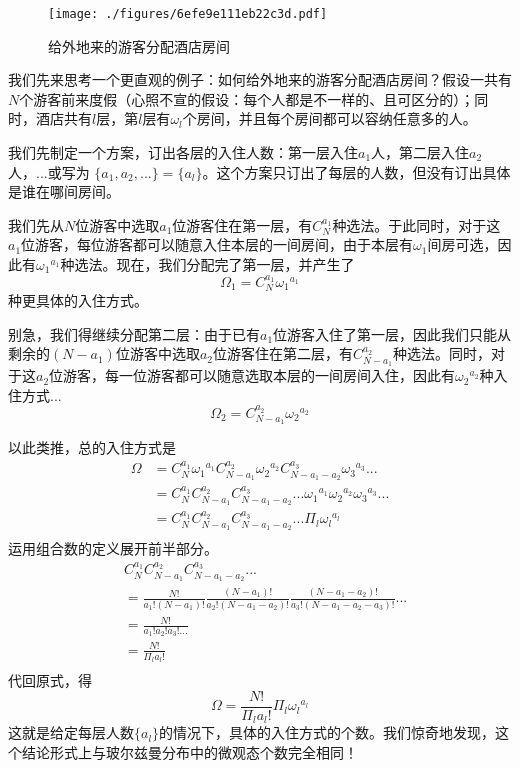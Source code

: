 \begin{example}{}
\begin{figure}[ht]
\centering
\texttt{[image: ./figures/6efe9e111eb22c3d.pdf]}
\caption{给外地来的游客分配酒店房间} \label{fig_MBsta_1}
\end{figure}
我们先来思考一个更直观的例子：如何给外地来的游客分配酒店房间？假设一共有$N$个游客前来度假（心照不宣的假设：每个人都是不一样的、且可区分的）；同时，酒店共有$l$层，第$l$层有$\omega_l$个房间，并且每个房间都可以容纳任意多的人。

我们先制定一个方案，订出各层的入住人数：第一层入住$a_1$人，第二层入住$a_2$人，...或写为 $\{a_1,a_2,...\}=\{a_l\}$。这个方案只订出了每层的人数，但没有订出具体是谁在哪间房间。

我们先从$N$位游客中选取$a_1$位游客住在第一层，有$C_N^{a_1}$种选法。于此同时，对于这$a_1$位游客，每位游客都可以随意入住本层的一间房间，由于本层有$\omega_1$间房可选，因此有${\omega_1}^{a_1}$种选法。现在，我们分配完了第一层，并产生了$$\Omega_1 = C_N^{a_1} {\omega_1}^{a_1}$$种更具体的入住方式。

别急，我们得继续分配第二层：由于已有$a_1$位游客入住了第一层，因此我们只能从剩余的$(N-a_1)$位游客中选取$a_2$位游客住在第二层，有$C_{N-a_1}^{a_2}$种选法。同时，对于这$a_2$位游客，每一位游客都可以随意选取本层的一间房间入住，因此有${\omega_2}^{a_2}$种入住方式...
$$\Omega_2 = C_{N-a_1}^{a_2} {\omega_2}^{a_2}$$

以此类推，总的入住方式是
$$
\begin{aligned}
\Omega &= C_N^{a_1} {\omega_1}^{a_1} C_{N-a_1}^{a_2} {\omega_2}^{a_2} C_{N-a_1-a_2}^{a_3} {\omega_3}^{a_3}...\\
&=C_N^{a_1} C_{N-a_1}^{a_2} C_{N-a_1-a_2}^{a_3} ... {\omega_1}^{a_1}{\omega_2}^{a_2}  {\omega_3}^{a_3}...\\
& = C_N^{a_1} C_{N-a_1}^{a_2} C_{N-a_1-a_2}^{a_3} ... \Pi_l{\omega_l}^{a_l}\\
\end{aligned}
$$
运用组合数的定义展开前半部分。
$$
\begin{aligned}
& C_N^{a_1} C_{N-a_1}^{a_2} C_{N-a_1-a_2}^{a_3} ...\\
&= \frac{N!}{a_1!(N-a_1)!} 
\frac{(N-a_1)!}{a_2!(N-a_1-a_2)!}
\frac{(N-a_1-a_2)!}{a_3!(N-a_1-a_2-a_3)!}
...\\
&=\frac{N!}{a_1!a_2!a_3!...} \\
&=\frac{N!}{\Pi_l a_l!} \\
\end{aligned}
$$
代回原式，得
$$
\Omega = \frac{N!}{\Pi_l a_l!}  \Pi_l{\omega_l}^{a_l}
$$
这就是给定每层人数$\{a_l\}$的情况下，具体的入住方式的个数。我们惊奇地发现，这个结论形式上与玻尔兹曼分布中的微观态个数完全相同！


\end{example}
